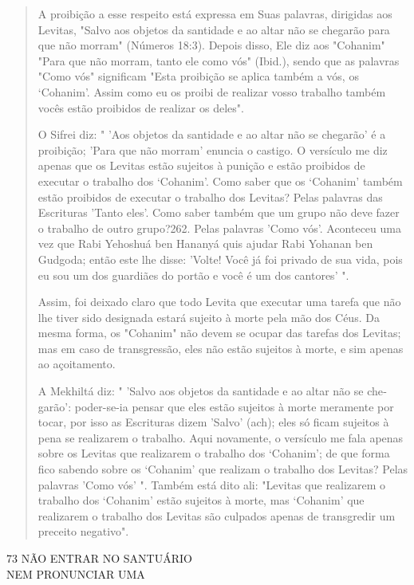 \begin{quote}
A proibição a esse respeito está expressa em Suas palavras, dirigidas
aos Levitas, "Salvo aos objetos da santidade e ao altar não se chegarão
para que não morram" (Números 18:3). Depois disso, Ele diz aos "Cohanim"
"Para que não morram, tanto ele como vós" (Ibid.), sendo que as palavras
"Como vós" significam "Esta proibição se aplica também a vós, os
`Cohanim'. Assim como eu os proibi de realizar vosso trabalho também
vocês estão proibidos de reali­zar os deles".

O Sifrei diz: " 'Aos objetos da santidade e ao altar não se chegarão' é
a proibição; 'Para que não morram' enuncia o castigo. O versículo me diz
apenas que os Levitas estão sujeitos à punição e estão proibidos de
executar o trabalho dos `Cohanim'. Como saber que os `Cohanim' também
estão proibi­dos de executar o trabalho dos Levitas? Pelas palavras das
Escrituras 'Tanto eles'. Como saber também que um grupo não deve fazer o
trabalho de outro gru­po?262. Pelas palavras 'Como vós'. Aconteceu uma
vez que Rabi Yehoshuá ben Hananyá quis ajudar Rabi Yohanan ben Gudgoda;
então este lhe disse: 'Volte! Você já foi privado de sua vida, pois eu
sou um dos guardiães do portão e você é um dos cantores' ".

Assim, foi deixado claro que todo Levita que executar uma tarefa que não
lhe tiver sido designada estará sujeito à morte pela mão dos Céus. Da
mesma forma, os "Cohanim" não devem se ocupar das tarefas dos Levitas;
mas em caso de transgressão, eles não estão sujeitos à morte, e sim
apenas ao açoitamento.

A Mekhiltá diz: " 'Salvo aos objetos da santidade e ao altar não se
che­garão': poder-se-ia pensar que eles estão sujeitos à morte meramente
por tocar, por isso as Escrituras dizem 'Salvo' (ach); eles só ficam
sujeitos à pena se realiza­rem o trabalho. Aqui novamente, o versículo
me fala apenas sobre os Levitas que realizarem o trabalho dos `Cohanim';
de que forma fico sabendo sobre os
`Cohanim' que realizam o trabalho dos Levitas? Pelas palavras 'Como vós'
". Também está dito ali: "Levitas que realizarem o trabalho dos
`Cohanim' estão sujeitos à morte, mas `Cohanim' que realizarem o
trabalho dos Levitas são cul­pados apenas de transgredir um preceito
negativo".
\end{quote}

73 NÃO ENTRAR NO SANTUÁRIO\\
NEM PRONUNCIAR UMA

